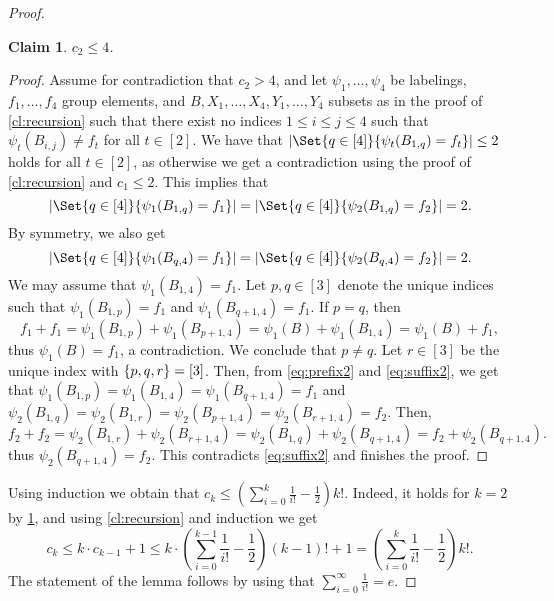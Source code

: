 \documentclass{article}
\DeclarePairedDelimiter{\set}{\{}{\}}
\newtheorem{claim}[theorem]{Claim}
\theoremstyle{definition}
\begin{document}
\begin{proof}
\begin{claim}
\label{cl:2labelings}
$c_2 \le 4$.
\end{claim}

\begin{proof}
Assume for contradiction that $c_2 > 4$, and let $\psi_1,\dots, \psi_4$ be labelings, $f_1,\dots, f_4$ group elements, and $B, X_1,\dots,X_4, Y_1,\dots, Y_4$ subsets as in the proof of \cref{cl:recursion} such that there exist no indices $1\le i \le j \le 4$ such that $\psi_t(B_{i,j})\ne f_t$ for all $t \in [2]$.
We have that $|\Set{q \in [4]}{\psi_t(B_{1,q}) = f_t}| \le 2$ holds for all $t \in [2]$, as otherwise we get a contradiction using the proof of \cref{cl:recursion} and $c_1 \le 2$.
This implies that 
\begin{equation} \label{eq:prefix2}
|\Set{q \in [4]}{\psi_1(B_{1,q}) = f_1}| = |\Set{q \in [4]}{\psi_2(B_{1,q}) = f_2}| = 2. 
\end{equation}
By symmetry, we also get 
\begin{equation} \label{eq:suffix2}
 |\Set{q \in [4]}{\psi_1(B_{q,4}) = f_1}| = |\Set{q \in [4]}{\psi_2(B_{q,4}) = f_2}| = 2.
 \end{equation}
We may assume that $\psi_1(B_{1,4}) = f_1$. Let $p, q\in [3]$ denote the unique indices such that $\psi_1(B_{1,p}) = f_1$ and $\psi_1(B_{q+1,4}) = f_1$. If $p = q$, then \[f_1 + f_1 = \psi_1(B_{1,p}) + \psi_1(B_{p+1, 4}) = \psi_1(B) + \psi_1(B_{1,4}) = \psi_1(B)+f_1,\]
thus $\psi_1(B) = f_1$, a contradiction. We conclude that $p \ne q$. Let $r\in [3]$ be the unique index with $\set{p,q,r} = [3]$.
Then, from \eqref{eq:prefix2} and \eqref{eq:suffix2}, we get that $\psi_1(B_{1,p}) = \psi_1(B_{1,4}) = \psi_1(B_{q+1,4}) = f_1$ and $\psi_2(B_{1,q}) = \psi_2(B_{1,r}) = \psi_2(B_{p+1, 4}) = \psi_2(B_{r+1,4}) = f_2$.
Then,
\[f_2+f_2 = \psi_2(B_{1,r})+\psi_2(B_{r+1, 4}) = \psi_2(B_{1,q})+\psi_2(B_{q+1, 4}) = f_2 + \psi_2(B_{q+1,4}).\]
thus $\psi_2(B_{q+1, 4}) = f_2$. This contradicts \eqref{eq:suffix2} and finishes the proof.
\end{proof}


Using induction we obtain that $c_k \le  \left(\sum_{i=0}^k \frac{1}{i!} - \frac12\right) k!$.
Indeed, it holds for $k=2$ by \cref{cl:2labelings}, and using \cref{cl:recursion} and induction we get
\[c_k \le k \cdot c_{k-1}+1 \le k \cdot \left(\sum_{i=0}^{k-1} \frac{1}{i!} - \frac12\right) (k-1)!  + 1 = \left(\sum_{i=0}^k \frac{1}{i!}-\frac12\right) k!.\]
The statement of the lemma follows by using that $\sum_{i=0}^\infty \frac{1}{i!} = e$.
\end{proof}
\end{document}
